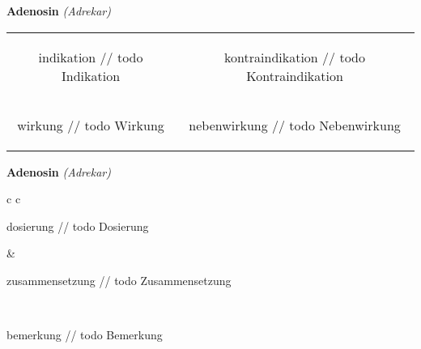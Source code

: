 \documentclass[12pt]{beamer}
\begin{document}
\begin{frame}{
    \textbf{Adenosin}
    \textit{(Adrekar)}
}
    \begin{tabular}{c c}
        \begin{beamercolorbox}[wd=\boxwidth\textwidth,ht=\boxheight\textheight,sep=1em]{indikation}
        // todo Indikation
        \end{beamercolorbox} & 
        \begin{beamercolorbox}[wd=\boxwidth\textwidth,ht=\boxheight\textheight,sep=1em]{kontraindikation}
        // todo Kontraindikation 
        \end{beamercolorbox} \\
        \begin{beamercolorbox}[wd=\boxwidth\textwidth,ht=\boxheight\textheight,sep=1em]{wirkung}
        // todo Wirkung
        \end{beamercolorbox} & 
        \begin{beamercolorbox}[wd=\boxwidth\textwidth,ht=\boxheight\textheight,sep=1em]{nebenwirkung}
        // todo Nebenwirkung
        \end{beamercolorbox} \\
    \end{tabular}
\end{frame}

\begin{frame}{
    \textbf{Adenosin}
    \textit{(Adrekar)}
}
    \begin{tabular}{c c}
        \begin{beamercolorbox}[wd=\boxwidth\textwidth,ht=\boxheight\textheight,sep=1em]{dosierung}
        // todo Dosierung
        \end{beamercolorbox} & 
        \begin{beamercolorbox}[wd=\boxwidth\textwidth,ht=\boxheight\textheight,sep=1em]{zusammensetzung}
        // todo Zusammensetzung
        \end{beamercolorbox} \\
        \begin{beamercolorbox}[wd=\textwidth,ht=\boxheight\textheight,sep=1em]{bemerkung}
        // todo Bemerkung
        \end{beamercolorbox} \\
    \end{tabular}
\end{frame}
\end{document}
